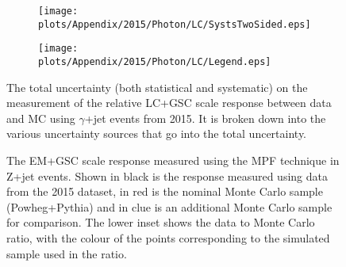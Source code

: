 \begin{figure}[!ht]
\captionsetup[subfigure]{labelformat=empty}
 \begin{center}
   \begin{subfigure}{0.5\textwidth}
     \hspace{-3cm}
     \texttt{[image: plots/Appendix/2015/Photon/LC/SystsTwoSided.eps]}
   \end{subfigure}
   \begin{subfigure}{0.5\textwidth}
     \hspace{-3cm}
     \texttt{[image: plots/Appendix/2015/Photon/LC/Legend.eps]}
   \end{subfigure}
 \end{center}
 \caption[Uncertainty on the LC+GSC scale response measurement using $\gamma$+jet]
 {\small The total uncertainty (both statistical and systematic) on the measurement of the relative LC+GSC scale response between data and MC using $\gamma$+jet events from 2015.  It is broken down into the various uncertainty sources that go into the total uncertainty.  }
 \label{Fig:GammaJetSystsLC2015}
\end{figure}

\begin{figure}[!ht]
  \begin{center}
  \end{center}
  \caption[EM scale response using Z+jet in 2015]
  {\small The EM+GSC scale response measured using the MPF technique in Z+jet events.  Shown in black is the response measured using data from the 2015 dataset, in red is the nominal Monte Carlo sample (Powheg+Pythia) and in clue is an additional Monte Carlo sample for comparison.  The lower inset shows the data to Monte Carlo ratio, with the colour of the points corresponding to the simulated sample used in the ratio.  }
  \label{plot:ZJetEM2015App}
\end{figure}


